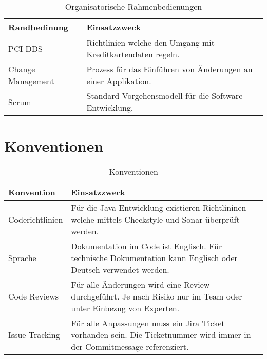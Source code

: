 \begin{table}[H]
	\centering
	\caption{Organisatorische Rahmenbedienungen}
	\begin{tabular}{ | p{4cm} | p{11cm} | }
		\toprule
		{\textbf{Randbedinung}} & {\textbf{Einsatzzweck}} \\
		\midrule
		PCI DDS & Richtlinien welche den Umgang mit Kreditkartendaten regeln. \\ \hline
		Change Management & Prozess für das Einführen von Änderungen an einer Applikation.\\ \hline
		Scrum & Standard Vorgehensmodell für die Software Entwicklung.\\ 
		\bottomrule
	\end{tabular}
\end{table}

\section{Konventionen}

\begin{table}[H]
	\centering
	\caption{Konventionen}
	\begin{tabular}{ | p{4cm} | p{11cm} | }
		\toprule
		{\textbf{Konvention}} & {\textbf{Einsatzzweck}} \\
		\midrule
		Coderichtlinien & Für die Java Entwicklung existieren Richtlininen welche mittels Checkstyle und Sonar überprüft werden. \\ \hline
		Sprache & Dokumentation im Code ist Englisch. Für technische Dokumentation kann Englisch oder Deutsch verwendet werden.\\ \hline
		Code Reviews & Für alle  Änderungen wird eine Review durchgeführt. Je nach Risiko nur im Team oder unter Einbezug von Experten.\\ \hline
		Issue Tracking & Für alle Anpassungen muss ein Jira Ticket vorhanden sein. Die Ticketnummer wird  immer in der Commitmessage referenziert.\\	
		\bottomrule
	\end{tabular}
\end{table}